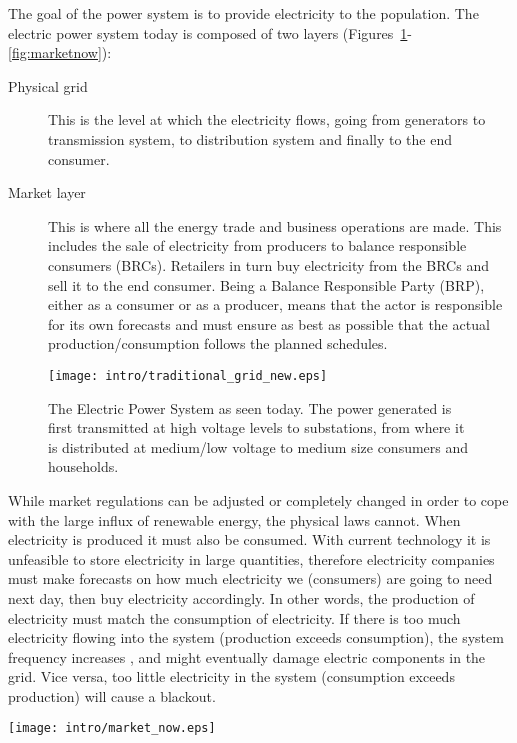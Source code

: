 The goal of the power system is to provide electricity to the population.
The electric power system today is composed of two layers (Figures~\ref{fig:powernow}-\ref{fig:marketnow}): 
\begin{description}
	\item[Physical grid] This is the level at which the electricity flows, going from generators to transmission system, to distribution system and finally to the end consumer.
	\item[Market layer] This is where all the energy trade and business operations are made. This includes the sale of electricity from producers to balance responsible consumers (BRCs). Retailers in turn buy electricity from the BRCs and sell it to the end consumer. Being a Balance Responsible Party (BRP), either as a consumer or as a producer, means that the actor is responsible for its own forecasts and must ensure as best as possible that the actual production/consumption follows the planned schedules.
\end{description}

\begin{figure}[t]
	\centering
	\caption{The Electric Power System as seen today. The power generated is first transmitted at high voltage levels to substations, from where it is distributed at medium/low voltage to medium size consumers and households.}\label{fig:powernow}
	\texttt{[image: intro/traditional\_grid\_new.eps]}
\end{figure}

While market regulations can be adjusted or completely changed in order to cope with the large influx of renewable energy, the physical laws cannot.
When electricity is produced it must also be consumed. With current technology it is unfeasible to store electricity in large quantities, therefore electricity companies must make forecasts on how much electricity we (consumers) are going to need next day, then buy electricity accordingly. In other words, the production of electricity must match the consumption of electricity. If there is too much electricity flowing into the system (production exceeds consumption), the system frequency increases%
, and might eventually damage electric components in the grid. Vice versa, too little electricity in the system (consumption exceeds production) will cause a blackout. 
\begin{figure*}[h]
	\centering
	\caption{The actors and relationships in the power market today. Note that the consumer buys electricity from a retailer, but has no further contact to the other market actors.}\label{fig:marketnow}
	\texttt{[image: intro/market\_now.eps]}
\end{figure*}

